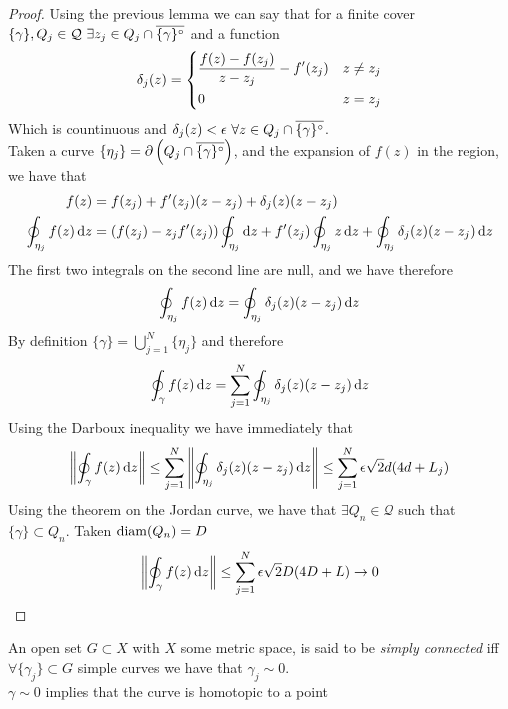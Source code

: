 \documentclass[../complete.tex]{subfiles}
\begin{document}
\begin{proof}
	Using the previous lemma we can say that for a finite cover $\{\gamma\},Q_j\in\mathcal{Q}\ \exists z_j\in Q_j\cap\overline{\{\gamma\}^{\circ}}$ and a function
	\begin{equation*}
		\delta_j(z)=\begin{dcases}\frac{f(z)-f(z_j)}{z-z_j}-f'(z_j)&z\ne z_j\\0&z=z_j\end{dcases}
	\end{equation*}
	Which is countinuous and $\delta_j(z)<\epsilon\ \forall z\in Q_j\cap\overline{\{\gamma\}^{\circ}}$.\\
	Taken a curve $\{\eta_j\}=\partial\left( Q_j\cap\overline{\{\gamma\}^{\circ}} \right)$, and the expansion of $f(z)$ in the region, we have that
	\begin{equation*}
		\begin{aligned}
			f(z)&=f(z_j)+f'(z_j)(z-z_j)+\delta_j(z)(z-z_j)\\
			\oint_{\eta_j}f(z)\operatorname{d\!} z&=\left( f(z_j)-z_jf'(z_j) \right)\oint_{\eta_j}\operatorname{d\!} z+f'(z_j)\oint_{\eta_j}z\operatorname{d\!} z+\oint_{\eta_j}\delta_j(z)(z-z_j)\operatorname{d\!} z
		\end{aligned}
	\end{equation*}
	The first two integrals on the second line are null, and we have therefore
	\begin{equation*}
		\oint_{\eta_j}f(z)\operatorname{d\!} z=\oint_{\eta_j}\delta_j(z)(z-z_j)\operatorname{d\!} z
	\end{equation*}
	By definition $\{\gamma\}=\bigcup_{j=1}^N\{\eta_j\}$ and therefore
	\begin{equation*}
		\oint_{\gamma}f(z)\operatorname{d\!} z=\sum_{j=1}^N\oint_{\eta_j}\delta_j(z)(z-z_j)\operatorname{d\!} z
	\end{equation*}
	Using the Darboux inequality we have immediately that
	\begin{equation*}
		\norm{\oint_{\gamma}f(z)\operatorname{d\!} z}\le\sum_{j=1}^N\norm{\oint_{\eta_j}\delta_j(z)(z-z_j)\operatorname{d\!} z}\le\sum_{j=1}^N\epsilon\sqrt{2}d(4d+L_j)
	\end{equation*}
	Using the theorem on the Jordan curve, we have that $\exists Q_n\in\mathcal{Q}$ such that $\{\gamma\}\subset Q_n$. Taken $\operatorname{diam}(Q_n)=D$
	\begin{equation*}
		\norm{\oint_{\gamma}f(z)\operatorname{d\!} z}\le\sum_{j=1}^N\epsilon\sqrt{2}D(4D+L)\to0
	\end{equation*}
\end{proof}
\begin{dfn}
	An open set $G\subset X$ with $X$ some metric space, is said to be \textit{simply connected} iff $\forall \{\gamma_j\}\subset G$ simple curves we have that $\gamma_j\sim0$.\\
	$\gamma\sim0$ implies that the curve is homotopic to a point
\end{dfn}
\end{document}
